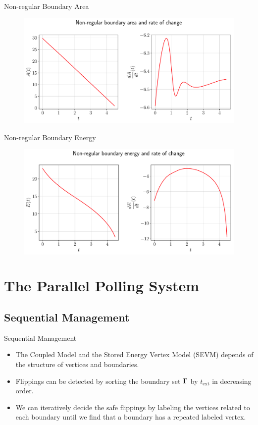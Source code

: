 \documentclass[usenames,dvipsnames]{beamer}
\begin{document}
\begin{frame}{Non-regular Boundary Area}
     \begin{figure}
        \centering
        \includegraphics[trim={0 0 0 0}, clip=true, scale=0.43]{figures/closed_boundary/nonregularboundary_area.pdf}
    \end{figure}
\end{frame}

\begin{frame}{Non-regular Boundary Energy}
     \begin{figure}
        \centering
        \includegraphics[trim={0 0 0 0}, clip=true, scale=0.43]{figures/closed_boundary/nonregularboundary_energy.pdf}
    \end{figure}
\end{frame}

\section{The Parallel Polling System}

\subsection{Sequential Management}
\begin{frame}{Sequential Management}
\begin{itemize}
    \item The Coupled Model and the Stored Energy Vertex Model (SEVM) depends of the structure of vertices and boundaries.
    \item Flippings can be detected by sorting the boundary set $\bm{\Gamma}$ by $t_{\text{ext}}$ in decreasing order.
    \item We can iteratively decide the safe flippings by labeling the vertices related to each boundary until we find that a boundary has a repeated labeled vertex.
\end{itemize}
\end{frame}
\end{document}
